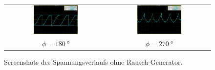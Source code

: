 \begin{figure}
\begin{tabular}{cc}
  \includegraphics[width=0.45\textwidth]{content/img/screenshots/MAP004.png} &  \includegraphics[width=0.45\textwidth]{content/img/screenshots/MAP006.png} \\
  $\phi = \SI{180}{\degree}$ &
  $\phi = \SI{270}{\degree}$
\end{tabular}
\caption{Screenshots des Spannungsverlaufs ohne Rausch-Generator.}
\label{fig:screenshots_1}
\end{figure}

